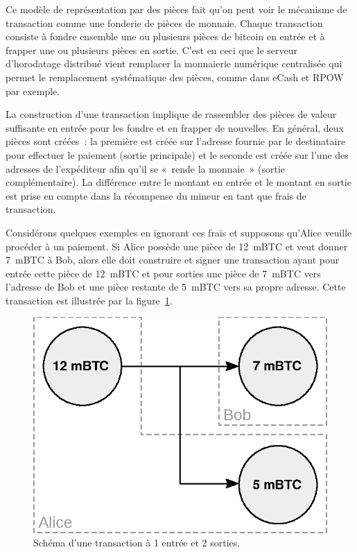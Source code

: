 Ce modèle de représentation par des pièces fait qu'on peut voir le mécanisme de transaction comme une fonderie de pièces de monnaie. Chaque transaction consiste à fondre ensemble une ou plusieurs pièces de bitcoin en entrée et à frapper une ou plusieurs pièces en sortie. C'est en ceci que le serveur d'horodatage distribué vient remplacer la monnaierie numérique centralisée qui permet le remplacement systématique des pièces, comme dans eCash et RPOW par exemple. %

La construction d'une transaction implique de rassembler des pièces de valeur suffisante en entrée pour les fondre et en frapper de nouvelles. En général, deux pièces sont créées~: la première est créée sur l'adresse fournie par le destinataire pour effectuer le paiement (sortie principale) et le seconde est créée sur l'une des adresses de l'expéditeur afin qu'il se «~rende la monnaie~» (sortie complémentaire). La différence entre le montant en entrée et le montant en sortie est prise en compte dans la récompense du mineur en tant que frais de transaction.

Considérons quelques exemples en ignorant ces frais et supposons qu'Alice veuille procéder à un paiement. Si Alice possède une pièce de 12~mBTC et veut donner 7~mBTC à Bob, alors elle doit construire et signer une transaction ayant pour entrée cette pièce de 12~mBTC et pour sorties une pièce de 7~mBTC vers l'adresse de Bob et une pièce restante de 5~mBTC vers sa propre adresse. Cette transaction est illustrée par la figure~\ref{fig:transaction-1i-2o}.

\begin{figure}[ht]
  \centering
  \includegraphics[scale=0.75]{img/transaction-1i-2o.eps}
  \caption{Schéma d'une transaction à 1 entrée et 2 sorties.}
  \label{fig:transaction-1i-2o}
\end{figure}

